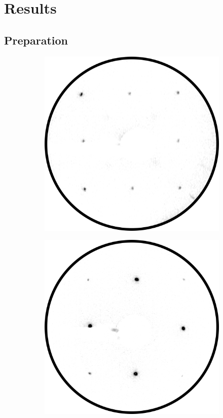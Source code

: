\chapter{Results}

\section*{Preparation}
\begin{figure}[h]
    \centering
    \begin{subfigure}{0.25\textwidth}
        \includegraphics[width = \textwidth]{Plots/Fe.png}
        \caption{}
        \label{fig:leed_Fe}
    \end{subfigure}
    \hfill
    \begin{subfigure}{0.25\textwidth}
        \includegraphics[width = \textwidth]{Plots/FeO.png}

\end{subfigure}
\end{figure}
